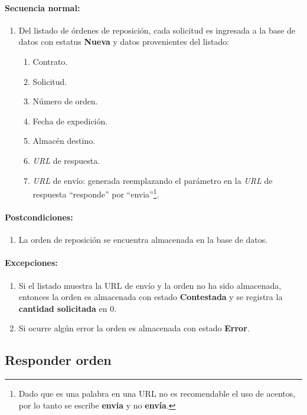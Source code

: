 \paragraph{Secuencia normal:}
\begin{enumerate}
  \item Del listado de órdenes de reposición, cada solicitud es ingresada a la base de datos con estatus \textbf{Nueva} y datos provenientes del listado:
  \begin{enumerate}
    \item Contrato.
    \item Solicitud.
    \item Número de orden.
    \item Fecha de expedición.
    \item Almacén destino.
    \item \textit{URL} de respuesta.
    \item \textit{URL} de envío: generada reemplazando el parámetro en la \textit{URL} de respuesta ``responde'' por ``envia''\footnote{Dado que es una palabra en una URL no es recomendable el uso de acentos, por lo tanto se escribe \textbf{envia} y no \textbf{envía}.}.
  \end{enumerate}
\end{enumerate}
\paragraph{Postcondiciones:}
\begin{enumerate}
  \item La orden de reposición se encuentra almacenada en la base de datos.
\end{enumerate}
\paragraph{Excepciones:}
\begin{enumerate}
  \item Si el listado muestra la URL de envío y la orden no ha sido almacenada, entonces la orden es almacenada con estado \textbf{Contestada} y se registra la \textbf{cantidad solicitada} en 0.
  \item Si ocurre algún error la orden es almacenada con estado \textbf{Error}.
\end{enumerate}


\subsection{Responder orden}\label{cu-responder-orden}
